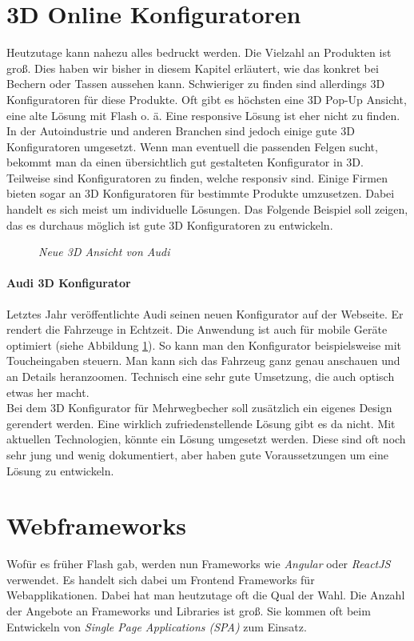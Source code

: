 \section{3D Online Konfiguratoren}
\label{sec:3dconfigurators}
%
Heutzutage kann nahezu alles bedruckt werden. Die Vielzahl an Produkten ist groß. Dies haben wir bisher in diesem Kapitel erläutert, wie das konkret bei Bechern oder Tassen aussehen kann. Schwieriger zu finden sind allerdings 3D Konfiguratoren für diese Produkte. Oft gibt es höchsten eine 3D Pop-Up Ansicht, eine alte Lösung mit Flash o. ä. Eine responsive Lösung ist eher nicht zu finden. \\
In der Autoindustrie und anderen Branchen sind jedoch einige gute 3D Konfiguratoren umgesetzt. Wenn man eventuell die passenden Felgen sucht, bekommt man da einen übersichtlich gut gestalteten Konfigurator in 3D. Teilweise sind Konfiguratoren zu finden, welche responsiv sind. Einige Firmen bieten sogar an 3D Konfiguratoren für bestimmte Produkte umzusetzen. Dabei handelt es sich meist um individuelle Lösungen. Das Folgende Beispiel soll zeigen, das es durchaus möglich ist gute 3D Konfiguratoren zu entwickeln.
%
\begin{figure}[]
	\centering
	{}
	\caption[Audi Konfigurator]{\textit{Neue 3D Ansicht von Audi}}
	\label{fig:audi}
\end{figure}
%
%
\paragraph{Audi 3D Konfigurator}Letztes Jahr veröffentlichte Audi seinen neuen Konfigurator auf der Webseite. Er rendert die Fahrzeuge in Echtzeit. Die Anwendung ist auch für mobile Geräte optimiert (siehe Abbildung \ref{fig:audi}). So kann man den Konfigurator beispielsweise mit Toucheingaben steuern. Man kann sich das Fahrzeug ganz genau anschauen und an Details heranzoomen. Technisch eine sehr gute Umsetzung, die auch optisch etwas her macht. \\
%
Bei dem 3D Konfigurator für Mehrwegbecher soll zusätzlich ein eigenes Design gerendert werden. Eine wirklich zufriedenstellende Lösung gibt es da nicht. Mit aktuellen Technologien, könnte ein Lösung umgesetzt werden. Diese sind oft noch sehr jung und wenig dokumentiert, aber haben gute Voraussetzungen um eine Lösung zu entwickeln.
%
\section{Webframeworks}
\label{sec:webframeworks}
%
Wofür es früher Flash gab, werden nun Frameworks wie \textit{Angular} oder \textit{ReactJS} verwendet. Es handelt sich dabei um Frontend Frameworks für Webapplikationen. Dabei hat man heutzutage oft die Qual der Wahl. Die Anzahl der Angebote an Frameworks und Libraries ist groß. Sie kommen oft beim Entwickeln von \textit{Single Page Applications (SPA)}  zum Einsatz.
%
